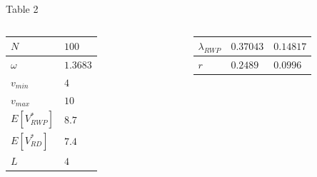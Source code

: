 \documentclass{beamer}
\begin{document}
\begin{frame}{Table 2}
    \begin{columns}
        \fontsize{12pt}{16}\selectfont
        \begin{table}[h]
            \begin{tabular}{ | l | l | }
                \hline
                    \textbf{$N$}                                &       $100$             \\ \hline
                    \textbf{$\omega$}                           &       $1.3683$          \\ \hline
                    \textbf{$v_{min}$}                          &       $4$               \\ \hline
                    \textbf{$v_{max}$}                          &       $10$              \\ \hline
                    \textbf{$E[V^*_{RWP}]$}                     &       $8.7$             \\ \hline
                    \textbf{$E[V^*_{RD}]$}                      &       $7.4$             \\ \hline
                    \textbf{$L$}                                &       $4$               \\ \hline
            \end{tabular}
        \end{table}

        \begin{table}[h]
            \begin{tabular}{ | l | l | l | }
                \hline
                    \textbf{$\lambda_{RWP}$}                    &       $0.37043$          &            $0.14817$ \\ \hline
                    \textbf{$r$}                                &       $0.2489$           &            $0.0996$  \\ \hline
            \end{tabular}
        \end{table}

    \end{columns}
\end{frame}

\end{document}
